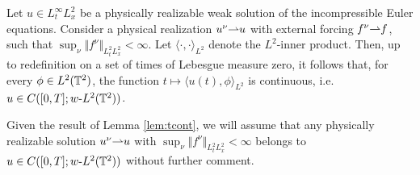 \documentclass[reqno,12pt]{amsart}
\begin{document}
\begin{lemma}
\label{lem:tcont}
Let $u\in L^\infty_t L^2_x$ be a physically realizable weak solution of the incompressible Euler equations. Consider a physical realization $u^\nu {\rightharpoonup} u$ with external forcing $f^\nu {\rightharpoonup} f$, such that $\sup_{\nu} \Vert f^\nu \Vert_{L^2_tL^2_x} < \infty$. Let $\langle \cdot, \cdot \rangle_{L^2}$ denote  the $L^2$-inner product. Then, up to redefinition on a set of times of Lebesgue measure zero, it follows that, for every $\phi \in L^2(\mathbb{T}^2)$, the function $t \mapsto \langle u(t), \phi \rangle_{L^2}$ is continuous, i.e. $u \in C([0,T];w\text{-}L^2(\mathbb{T}^2))$.
\end{lemma}

\begin{remark}
  Given the result of Lemma \ref{lem:tcont}, we will assume that any physically realizable solution $u^\nu {\rightharpoonup} u$ with $\sup_{\nu} \Vert f^\nu \Vert_{L^2_tL^2_x}<\infty$ belongs to $u\in C([0,T];w\text{-}L^2(\mathbb{T}^2))$ without further comment.
\end{remark}
\end{document}
